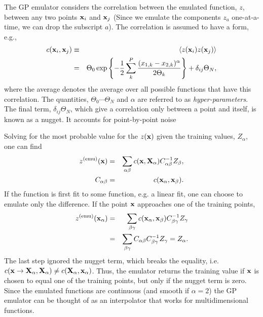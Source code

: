 The GP emulator considers the correlation between the emulated function, $z$, between any two points ${\bf x}_i$ and ${\bf x}_j$ (Since we emulate the components $z_a$ one-at-a-time, we can drop the subscript $a$). The correlation is assumed to have a form, e.g.,
\begin{eqnarray}
\label{eq:hyperform}
c({\bf x}_i,{\bf x}_j)&\equiv&\langle z({\bf x}_i)z({\bf x}_j)\rangle\\
\nonumber
&=&\Theta_0\exp\left\{-\frac{1}{2}\sum_k^P \frac{(x_{1,k}-x_{2,k})^\alpha}{2\Theta_k}\right\} +\delta_{ij}\Theta_N,
\end{eqnarray}
where the average denotes the average over all possible functions that have this correlation. The quantities, $\Theta_0\cdots\Theta_N$ and $\alpha$ are referred to as {\it hyper-parameters}. The final term, $\delta_{ij}\Theta_N$, which give a correlation only between a point and itself, is known as a nugget. It accounts for point-by-point noise

Solving for the most probable value for the $z({\bf x})$ given the training values, $Z_\alpha$, one can find
\begin{eqnarray}
z^{\rm(emu)}({\bf x})&=&\sum_{\alpha\beta}c({\bf x},{\bf X}_\alpha) C^{-1}_{\alpha\beta}Z_\beta,\\
\nonumber
C_{\alpha\beta}&=&c({\bf x}_\alpha,{\bf x}_\beta).
\end{eqnarray}
If the function is first fit to some function, e.g. a linear fit, one can choose to emulate only the difference. If the point ${\bf x}$ approaches one of the training points,
\begin{eqnarray}
z^{\rm(emu)}({\bf x}_\alpha)&=&\sum_{\beta\gamma}c({\bf x}_\alpha,{\bf x}_\beta) C^{-1}_{\beta\gamma}Z_\gamma\\
\nonumber
&=&\sum_{\beta\gamma}C_{\alpha\beta}C^{-1}_{\beta\gamma}Z_\gamma=Z_\alpha.
\end{eqnarray}
The last step ignored the nugget term, which breaks the equality, i.e. $c({\bf x}\rightarrow {\bf X}_\alpha,{\bf X}_\alpha)\ne c({\bf X_{\alpha},{\bf x}_\alpha})$. Thus, the emulator returns the training value if ${\bf x}$ is chosen to equal one of the training points, but only if the nugget term is zero. Since the emulated functions are continuous (and smooth if $\alpha=2$) the GP emulator can be thought of as an interpolator that works for multidimensional functions.

